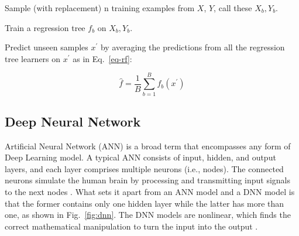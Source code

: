 \noindent
\begin{myenumerate}
  \item Sample (with replacement) n training examples from $X$, $Y$, call these $X_b, Y_b$.
  \item Train a regression tree $f_b$ on $X_b, Y_b$.
  \item Predict unseen samples $x^{'}$ by averaging the predictions from all the regression tree learners on $x^{'}$ as in Eq.~\ref{eq-rf}:
\end{myenumerate}

\begin{equation}\label{eq-rf}
  \hat{f}=\frac{1}{B}\sum_{b=1}^{B}f_b(x^{'})
\end{equation}

\subsection{Deep Neural Network}
Artificial Neural Network (ANN) is a broad term that encompasses any form of Deep Learning model. A typical ANN consists of input, hidden, and output layers, and each layer comprises multiple neurons (i.e., nodes). The connected neurons simulate the human brain by processing and transmitting input signals to the next nodes \citep{mohseni-dargahChapter12Machine2022}. What sets it apart from an ANN model and a DNN model is that the former contains only one hidden layer while the latter has more than one, as shown in Fig.~\ref{fig:dnn}. The DNN models are nonlinear, which finds the correct mathematical manipulation to turn the input into the output \citep{bangaloreaiDeepNeuralNetwork2018}.

